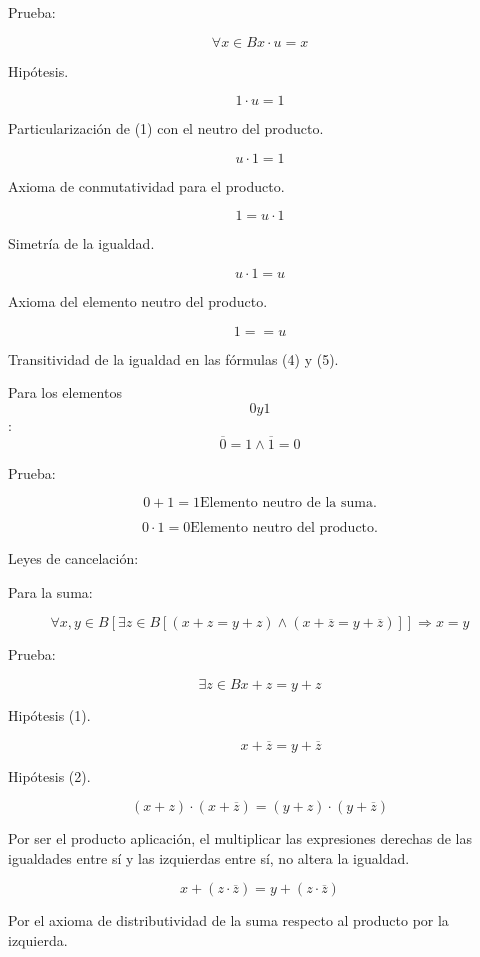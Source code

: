 Prueba:

\[\forall{x \in B}{{x \cdot u} = x}\]

Hipótesis.

\[{1 \cdot u} = 1\]

Particularización de (1) con el neutro del producto.

\[{u \cdot 1} = 1\]

Axioma de conmutatividad para el producto.

\[1 = {u \cdot 1}\]

Simetría de la igualdad.

\[{u \cdot 1} = u\]

Axioma del elemento neutro del producto.

\[{1 =} = u\]

Transitividad de la igualdad en las fórmulas (4) y (5).

Para los elementos \[0y1\]:
\[{\overline{0} = 1} \land {\overline{1} = 0}\]

Prueba:

\[{{0 + 1} = 1}\text{Elemento neutro de la suma.}\]

\[0{\cdot}1{= 0}\text{Elemento neutro del producto.}\]

Leyes de cancelación:

Para la suma:

\[\forall x,{y \in B}\left\lbrack {\exists{z \in B}\left\lbrack {\left( {{x + z} = {y + z}} \right) \land \left( {{x + \overline{z}} = {y + \overline{z}}} \right)} \right\rbrack} \right\rbrack\Rightarrow{x = y}\]

Prueba:

\[{}{}{}\exists{z \in B}{}{}{}{{x + z} = {y + z}}\]

Hipótesis (1).

\[{}{}{}\phantom{\exists{z \in B}}{}{}{}{{x + \overline{z}} = {y + \overline{z}}}\]

Hipótesis (2).

\[{\left( {x + z} \right) \cdot \left( {x + \overline{z}} \right)} = {\left( {y + z} \right) \cdot \left( {y + \overline{z}} \right)}\]

Por ser el producto aplicación, el multiplicar las expresiones derechas
de las igualdades entre sí y las izquierdas entre sí, no altera la
igualdad.

\[{x + \left( {z \cdot \overline{z}} \right)} = {y + \left( {z \cdot \overline{z}} \right)}\]

Por el axioma de distributividad de la suma respecto al producto por la
izquierda.

